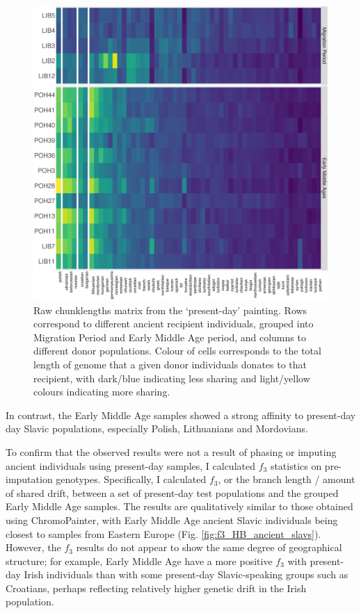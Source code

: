 \begin{figure}[htp]
    \centering
    \includegraphics[width=1.0\textwidth]{../images/chapter5/copymatrix_moderns_ancient_slavs.pdf}
    \caption{Raw chunklengths matrix from the `present-day' painting. Rows correspond to different ancient recipient individuals, grouped into Migration Period and Early Middle Age period, and columns to different donor populations. Colour of cells corresponds to the total length of genome that a given donor individuals donates to that recipient, with dark/blue  indicating less sharing and light/yellow colours indicating more sharing.}
    \label{fig:copymatrix_moderns_ancient_slavs}
\end{figure} 

In contrast, the Early Middle Age samples showed a strong affinity to present-day day Slavic populations, especially Polish, Lithuanians and Mordovians. 

To confirm that the observed results were not a result of phasing or imputing ancient individuals using present-day samples, I calculated $f_{3}$ statistics on pre-imputation genotypes. Specifically, I calculated $f_{3}$, or the branch length / amount of shared drift, between a set of present-day test populations and the grouped Early Middle Age samples. The results are qualitatively similar to those obtained using ChromoPainter, with Early Middle Age ancient Slavic individuals being closest to samples from Eastern Europe (Fig. \ref{fig:f3_HB_ancient_slavs}). However, the $f_{3}$ results do not appear to show the same degree of geographical structure; for example, Early Middle Age have a more positive $f_{3}$ with present-day Irish individuals than with some present-day Slavic-speaking groups such as Croatians, perhaps reflecting relatively higher genetic drift in the Irish population.

